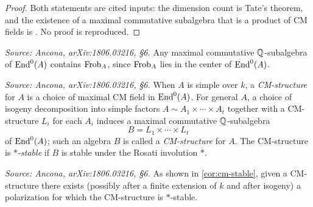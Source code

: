 \begin{proof}
  Both statements are cited inputs: the dimension count is Tate's theorem, and
  the existence of a maximal commutative subalgebra that is a product of CM
  fields is \cite[Lemma 2]{TateBour}. No proof is reproduced.
\end{proof}

\begin{remark}
  \label{rem:frob}
  \textit{Source: Ancona, arXiv:1806.03216, §6.}
  Any maximal commutative \(\mathbb{Q}\)-subalgebra of \(\mathrm{End}^0(A)\) contains
  \(\mathrm{Frob}_A\), since \(\mathrm{Frob}_A\) lies in the center of \(\mathrm{End}^0(A)\).
\end{remark}

\begin{definition}[CM-structure]
  \label{def:CM-structure}
  \textit{Source: Ancona, arXiv:1806.03216, §6.}
  When \(A\) is simple over \(k\), a \emph{CM-structure} for \(A\) is a choice of
  maximal CM field in \(\mathrm{End}^0(A)\). For general \(A\), a choice of isogeny
  decomposition into simple factors \(A \sim A_1 \times \cdots \times A_t\)
  together with a CM-structure \(L_i\) for each \(A_i\) induces a maximal
  commutative \(\mathbb{Q}\)-subalgebra
  \[B = L_1 \times \cdots \times L_t\]
  of \(\mathrm{End}^0(A)\); such an algebra \(B\) is called a \emph{CM-structure} for
  \(A\). The CM-structure is \emph{\(*\)-stable} if \(B\) is stable under the
  Rosati involution \(*\).
\end{definition}

\begin{remark}
  \label{rem:cm-stable-exists}
  \textit{Source: Ancona, arXiv:1806.03216, §6.}
  As shown in \cref{cor:cm-stable}, given a CM-structure there exists (possibly
  after a finite extension of \(k\) and after isogeny) a polarization for which
  the CM-structure is \(*\)-stable.
\end{remark}


